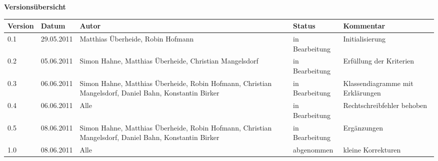 
{\textbf{Versionsübersicht}}\\[2ex]

\begin{longtable}{|m{1.78cm}|m{1.59cm}|m{2.86cm}|m{1.9cm}|m{5.25cm}|}

  \hline                                              %

  \textbf{Version}  &    \textbf{Datum}  &    \textbf{Autor}  &
  \textbf{Status}   &    \textbf{Kommentar}       \\  %
  \hline                                              %


  0.1   & 29.05.2011   &  Matthias Überheide, Robin Hofmann& in Bearbeitung &   Initialisierung\\      %
  \hline     
	0.2 & 05.06.2011 & Simon Hahne, Matthias Überheide, Christian Mangelsdorf & in Bearbeitung & Erfüllung der Kriterien\\
	\hline
	0.3 & 06.06.2011 & Simon Hahne, Matthias Überheide, Robin Hofmann, Christian Mangelsdorf, Daniel Bahn, Konstantin Birker & in Bearbeitung & Klassendiagramme mit Erklärungen\\
	\hline
	0.4 & 06.06.2011 & Alle & in Bearbeitung & Rechtschreibfehler behoben\\
	\hline
	0.5 & 08.06.2011 & Simon Hahne, Matthias Überheide, Robin Hofmann, Christian Mangelsdorf, Daniel Bahn, Konstantin Birker & in Bearbeitung & Ergänzungen\\
	\hline	
	1.0 & 08.06.2011 & Alle & abgenommen & kleine Korrekturen\\
	\hline		
																						

\end{longtable}
